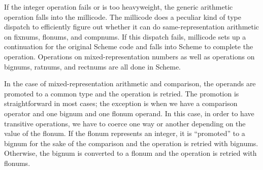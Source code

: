If the integer operation fails or is too heavyweight, the generic arithmetic
operation falls into the millicode. The millicode does a peculiar kind of
type dispatch to efficiently figure out whether it can do same-representation
arithmetic on fixnums, flonums, and compnums. If this dispatch fails,
millicode sets up a continuation for the original Scheme code and falls
into Scheme to complete the operation. Operations on mixed-representation
numbers as well as operations on bignums, ratnums, and rectnums are
all done in Scheme.

In the case of mixed-representation arithmetic and comparison, the operands
are promoted to a common type and the operation is retried. The promotion
is straightforward in most cases; the exception is when we have a comparison
operator and one bignum and one flonum operand. In this case, in order to
have transitive operations, we have to coerce one way or another depending
on the value of the flonum. If the flonum represents an integer, it is 
``promoted'' to a bignum for the sake of the comparison and the operation
is retried with bignums. Otherwise, the bignum is converted to a flonum
and the operation is retried with flonums.



